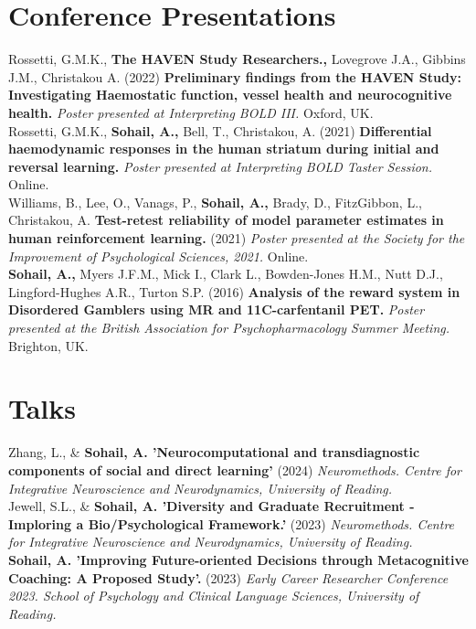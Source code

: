 \documentclass[10pt, a4paper]{article}
\begin{document}
\section*{Conference Presentations}
Rossetti, G.M.K., \textbf{The HAVEN Study Researchers.,} Lovegrove J.A., Gibbins J.M., Christakou A. (2022) \textbf{Preliminary
findings from the HAVEN Study: Investigating Haemostatic function, vessel health and neurocognitive health.}
\textit{Poster presented at Interpreting BOLD III.} Oxford, UK. \\

Rossetti, G.M.K., \textbf{Sohail, A.,} Bell, T., Christakou, A. (2021) \textbf{Differential haemodynamic responses in the human striatum
during initial and reversal learning.} \textit{Poster presented at Interpreting BOLD Taster Session.} Online. \\

Williams, B., Lee, O., Vanags, P., \textbf{Sohail, A.,} Brady, D., FitzGibbon, L., Christakou, A. \textbf{Test-retest reliability of
model parameter estimates in human reinforcement learning.} (2021) \textit{Poster presented at the Society for the Improvement 
of Psychological Sciences, 2021.} Online. \\

\textbf{Sohail, A.,} Myers J.F.M., Mick I., Clark L., Bowden-Jones H.M., Nutt D.J., Lingford-Hughes A.R., Turton S.P. (2016)
\textbf{Analysis of the reward system in Disordered Gamblers using MR and 11C-carfentanil PET.} \textit{Poster presented at the British 
Association for Psychopharmacology Summer Meeting.} Brighton, UK.


\section*{Talks}
Zhang, L., \& \textbf{Sohail, A. 'Neurocomputational and transdiagnostic components of social and direct learning'} (2024)
\textit{Neuromethods. Centre for Integrative Neuroscience and Neurodynamics, University of Reading.} \\

Jewell, S.L., \& \textbf{Sohail, A. 'Diversity and Graduate Recruitment - Imploring a Bio/Psychological Framework.'} (2023)
\textit{Neuromethods. Centre for Integrative Neuroscience and Neurodynamics, University of Reading.} \\

\textbf{Sohail, A. 'Improving Future-oriented Decisions through Metacognitive Coaching: A Proposed Study'.} (2023)
\textit{Early Career Researcher Conference 2023. School of Psychology and Clinical Language Sciences, University of Reading.} \\
\end{document}
